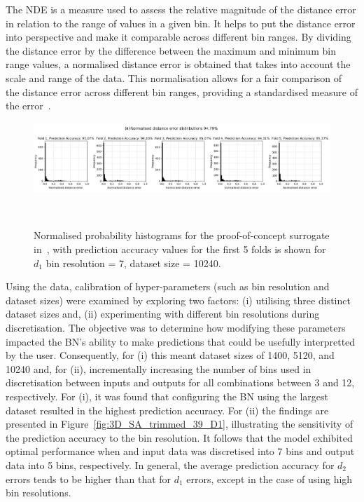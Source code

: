 \documentclass[journal]{IEEEtran}
\begin{document}
The NDE is a measure used to assess the relative magnitude of the distance error in relation to the range of values in a given bin. It helps to put the distance error into perspective and make it comparable across different bin ranges. By dividing the distance error by the difference between the maximum and minimum bin range values, a normalised distance error is obtained that takes into account the scale and range of the data. This normalisation allows for a fair comparison of the distance error across different bin ranges, providing a standardised measure of the error~\cite{Conti2019}.

\begin{figure}
    \centering
    \includegraphics[width=\textwidth]{figures/validation_plots/PROCESS/st20_d1_7bins_folds.png}
    \caption{\small Normalised probability histograms for the proof-of-concept surrogate in~\cite{Griffiths2024}, with prediction accuracy values for the first 5 folds is shown for $d_{1}$ bin resolution = 7, dataset size = 10240.}~\label{fig:k-foldhistograms}
\end{figure}


Using the data, calibration of hyper-parameters (such as bin resolution and dataset sizes) were examined by exploring two factors: (i) utilising three distinct dataset sizes and, (ii) experimenting with different bin resolutions during discretisation. The objective was to determine how modifying these parameters impacted the BN's ability to make predictions that could be usefully interpretted by the user. Consequently, for (i) this meant dataset sizes of 1400, 5120, and 10240 and, for (ii), incrementally increasing the number of bins used in discretisation between inputs and outputs for all combinations between 3 and 12, respectively. For (i), it was found that configuring the BN using the largest dataset resulted in the highest prediction accuracy. For (ii) the findings are presented in Figure~\ref{fig:3D_SA_trimmed_39_D1}, illustrating the sensitivity of the prediction accuracy to the bin resolution. It follows that the model exhibited optimal performance when and input data was discretised into 7 bins and output data into 5 bins, respectively. In general, the average prediction accuracy for $d_{2}$ errors tends to be higher than that for $d_{1}$ errors, except in the case of using high bin resolutions.
\end{document}
